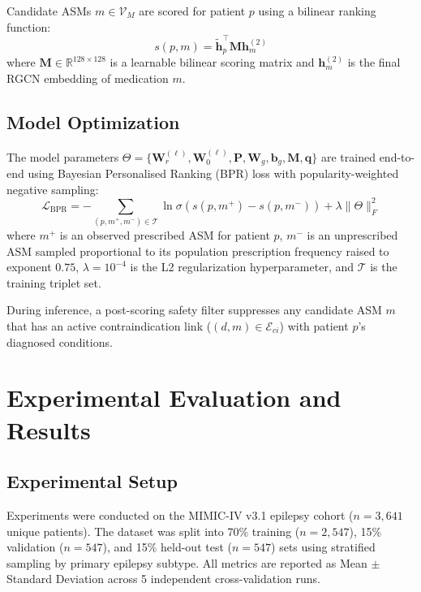 \documentclass[11pt,a4paper]{article}
\begin{document}
Candidate ASMs $m \in \mathcal{V}_M$ are scored for patient $p$ using a bilinear ranking function:
\begin{equation}
s(p, m) = \tilde{\mathbf{h}}_p^\top \mathbf{M} \mathbf{h}_m^{(2)}
\label{eq:scoring}
\end{equation}
where $\mathbf{M} \in \mathbb{R}^{128 \times 128}$ is a learnable bilinear scoring matrix and $\mathbf{h}_m^{(2)}$ is the final RGCN embedding of medication $m$.

\subsection{Model Optimization}

The model parameters $\Theta = \{\mathbf{W}_r^{(\ell)}, \mathbf{W}_0^{(\ell)}, \mathbf{P}, \mathbf{W}_g, \mathbf{b}_g, \mathbf{M}, \mathbf{q}\}$ are trained end-to-end using Bayesian Personalised Ranking (BPR) loss \cite{rendle2009bpr} with popularity-weighted negative sampling:
\begin{equation}
\mathcal{L}_{\text{BPR}} = - \sum_{(p, m^+, m^-) \in \mathcal{T}} \ln \sigma \left( s(p, m^+) - s(p, m^-) \right) + \lambda \|\Theta\|_F^2
\label{eq:bpr_loss}
\end{equation}
where $m^+$ is an observed prescribed ASM for patient $p$, $m^-$ is an unprescribed ASM sampled proportional to its population prescription frequency raised to exponent $0.75$, $\lambda = 10^{-4}$ is the L2 regularization hyperparameter, and $\mathcal{T}$ is the training triplet set.

During inference, a post-scoring safety filter suppresses any candidate ASM $m$ that has an active contraindication link ($(d, m) \in \mathcal{E}_{ci}$) with patient $p$'s diagnosed conditions.

\section{Experimental Evaluation and Results}

\subsection{Experimental Setup}
Experiments were conducted on the MIMIC-IV v3.1 epilepsy cohort ($n=3,641$ unique patients). The dataset was split into 70\% training ($n=2,547$), 15\% validation ($n=547$), and 15\% held-out test ($n=547$) sets using stratified sampling by primary epilepsy subtype. All metrics are reported as Mean $\pm$ Standard Deviation across 5 independent cross-validation runs.
\end{document}

